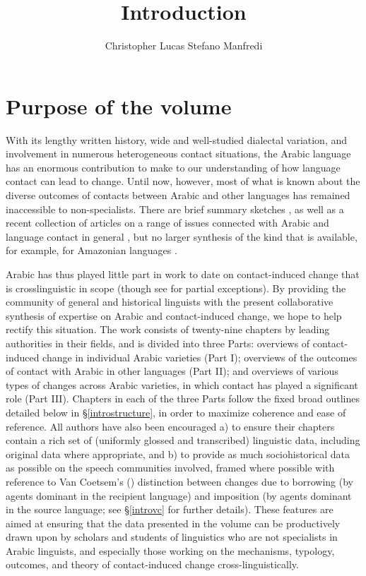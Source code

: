 \documentclass[output=paper]{langsci/langscibook}
\author{Christopher Lucas\affiliation{SOAS University of London}\lastand 
 Stefano Manfredi\affiliation{CNRS, SeDyL}
}
\title{Introduction}
\begin{document}
\label{introintro}

\section{Purpose of the volume}
With its lengthy written history, wide and well-studied dialectal variation, and involvement in numerous heterogeneous contact situations, the Arabic language has an enormous contribution to make to our understanding of how language contact can lead to change. Until now, however, most of what is known about the diverse outcomes of contacts between Arabic and other languages has remained inaccessible to non-specialists. There are brief summary sketches \citep{Thomason2011,Versteegh2001article,Versteegh2010,Manfredi2018}, as well as a recent collection of articles on a range of issues connected with Arabic and language contact in general \citep{ManfrediTosco2018}, but no larger synthesis of the kind that is available, for example, for Amazonian languages \citep{Aikhenvald2002}.

Arabic has thus played little part in work to date on contact-induced change that is crosslinguistic in
scope (though see \citealt{Matras2009,Trudgill2011} for partial exceptions). By providing the community of general and historical linguists with the present collaborative synthesis of expertise on Arabic and contact-induced change, we hope to help rectify this situation. The work consists of twenty-nine chapters by leading authorities in their fields, and is divided into three Parts: overviews of contact-induced change in individual Arabic varieties (Part I); overviews of the outcomes of contact with Arabic in other languages (Part II); and overviews of various types of changes across Arabic varieties, in which contact has played a significant role (Part III). Chapters in each of the three Parts follow the fixed broad outlines detailed below in §\ref{introstructure}, in order to maximize coherence and ease of reference. All authors have also been encouraged a) to ensure their chapters contain a rich set of (uniformly glossed and transcribed) linguistic data, including original data where appropriate, and b) to provide as much sociohistorical data as possible on the speech communities involved, framed where possible with reference to Van Coetsem’s (\citeyear{VanCoetsem1988,VanCoetsem2000}) distinction between changes due to borrowing (by agents dominant in the recipient language) and imposition (by agents dominant in the source language; see §\ref{introvc} for further details). These features are aimed at ensuring that the data presented in the volume can be productively drawn upon by scholars and students of linguistics who are not specialists in
Arabic linguists, and especially those working on the mechanisms, typology, outcomes, and theory of contact-induced change cross-linguistically. 
\end{document}
